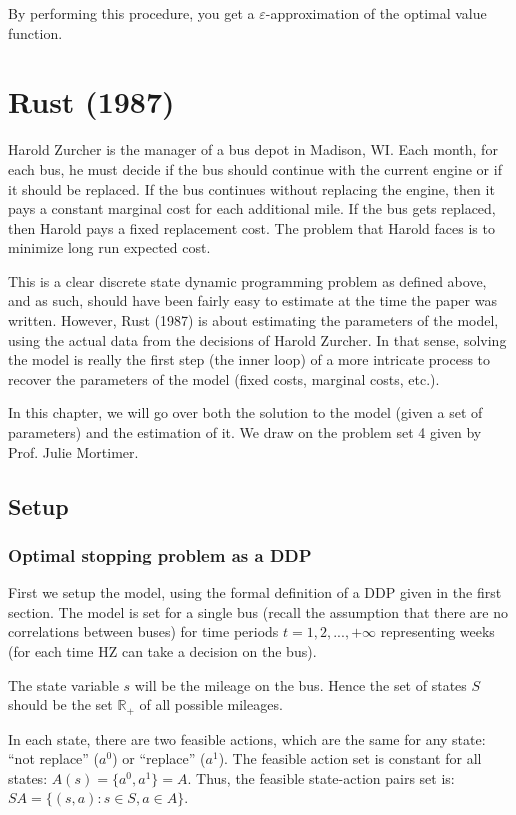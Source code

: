 By performing this procedure, you get a $\varepsilon$-approximation of the optimal value function.

\section{Rust (1987)}

Harold Zurcher is the manager of a bus depot in Madison, WI. Each month, for each bus, he must decide if the bus should continue with the current engine or if it should be replaced. If the bus continues without replacing the engine, then it pays a constant marginal cost for each additional mile. If the bus gets replaced, then Harold pays a fixed replacement cost. The problem that Harold faces is to minimize long run expected cost.

This is a clear discrete state dynamic programming problem as defined above, and as such, should have been fairly easy to estimate at the time the paper was written. However, Rust (1987) is about estimating the parameters of the model, using the actual data from the decisions of Harold Zurcher. In that sense, solving the model is really the first step (the inner loop) of a more intricate process to recover the parameters of the model (fixed costs, marginal costs, etc.).

In this chapter, we will go over both the solution to the model (given a set of parameters) and the estimation of it. We draw on the problem set 4 given by Prof. Julie Mortimer.

\subsection{Setup}

\subsubsection{Optimal stopping problem as a DDP}

First we setup the model, using the formal definition of a DDP given in the first section. The model is set for a single bus (recall the assumption that there are no correlations between buses) for time periods $t = 1, 2, ..., +\infty$ representing weeks (for each time HZ can take a decision on the bus).

The state variable $s$ will be the mileage on the bus. Hence the set of states $S$ should be the set $\mathbb{R}_+$ of all possible mileages.

In each state, there are two feasible actions, which are the same for any state: ``not replace'' ($a^0$) or ``replace'' ($a^1$). The feasible action set is constant for all states: $A(s) = \{a^0, a^1\} = A$. Thus, the feasible state-action pairs set is: $ SA = \{ (s, a) : s\in S, a\in A\}$.

